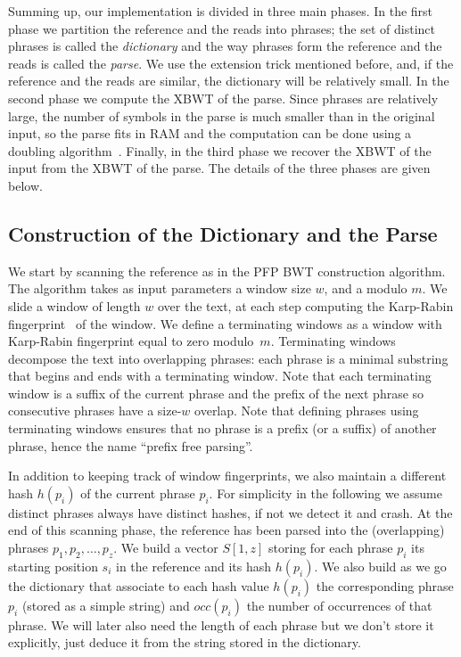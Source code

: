 Summing up, our implementation is divided in three main phases. In the first phase we partition the reference and the reads into phrases; the set of distinct phrases is called the {\em dictionary} and the way phrases form the reference and the reads is called the {\em parse}. We use the extension trick mentioned before, and, if the reference and the reads are similar, the dictionary will be relatively small.   
In the second phase we compute the XBWT of the parse. Since phrases are relatively large, the number of symbols in the parse is much smaller than in the original input, so the parse fits in RAM and the computation can be done using a doubling algorithm~\cite{doubling_algorithm}. Finally, in the third phase we recover the XBWT of the input from the XBWT of the parse.  {The details of the three phases are given below.} 



\subsection{Construction of the Dictionary and the Parse}

We start by scanning the reference as in the PFP BWT construction algorithm. The algorithm takes as input parameters a window size $w$, and a modulo $m$. We slide a window of length $w$ over the text, at each step computing the Karp-Rabin fingerprint~\cite{KRfingerprint} of the window. We define a terminating windows as a window with Karp-Rabin fingerprint equal to zero modulo~$m$. Terminating windows decompose the text into overlapping phrases: each phrase is a minimal substring that begins and ends with a terminating window. Note that each terminating window is a suffix of the current phrase and the prefix of the next phrase so consecutive phrases have a size-$w$ overlap. Note that defining phrases using terminating windows ensures that no phrase is a prefix (or a suffix) of another phrase, hence the name ``prefix free parsing''.

In addition to keeping track of window fingerprints, we also maintain a different hash $h(p_i)$ of the current phrase $p_i$. For simplicity in the following we assume distinct phrases always have distinct hashes, if not we detect it and crash. At the end of this scanning phase, the reference has been parsed into the (overlapping) phrases $p_1,p_2,\dots,p_z$. We build a vector $S[1,z]$ storing for each phrase $p_i$ its starting position $s_i$ in the reference and its hash $h(p_i)$.  {We also build as we go the dictionary that associate to each hash value $h(p_i)$ the corresponding phrase $p_i$  (stored as a simple string) and $occ(p_i)$ the number of occurrences of that phrase. We will later also need the length of each phrase but we don't store it explicitly, just deduce it from the string stored in the dictionary.}

